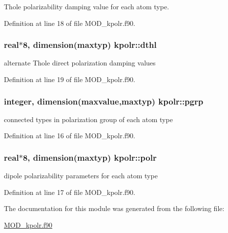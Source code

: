 Thole polarizability damping value for each atom type. 



Definition at line 18 of file M\-O\-D\-\_\-kpolr.\-f90.

\hypertarget{classkpolr_a4677ab2a3c6caf2953976d7715cc8d62}{
\subsubsection[{dthl}]{\setlength{\rightskip}{0pt plus 5cm}real$\ast$8, dimension(maxtyp) kpolr\-::dthl}}\label{classkpolr_a4677ab2a3c6caf2953976d7715cc8d62}


alternate Thole direct polarization damping values 



Definition at line 19 of file M\-O\-D\-\_\-kpolr.\-f90.

\hypertarget{classkpolr_a0e53a03241862e10a4c2075bf131a8a6}{
\subsubsection[{pgrp}]{\setlength{\rightskip}{0pt plus 5cm}integer, dimension(maxvalue,maxtyp) kpolr\-::pgrp}}\label{classkpolr_a0e53a03241862e10a4c2075bf131a8a6}


connected types in polarization group of each atom type 



Definition at line 16 of file M\-O\-D\-\_\-kpolr.\-f90.

\hypertarget{classkpolr_a2815e5ccaabe2b56f7e6de72e0c52ed3}{
\subsubsection[{polr}]{\setlength{\rightskip}{0pt plus 5cm}real$\ast$8, dimension(maxtyp) kpolr\-::polr}}\label{classkpolr_a2815e5ccaabe2b56f7e6de72e0c52ed3}


dipole polarizability parameters for each atom type 



Definition at line 17 of file M\-O\-D\-\_\-kpolr.\-f90.



The documentation for this module was generated from the following file\-:\begin{DoxyCompactItemize}
\item 
\hyperlink{MOD__kpolr_8f90}{M\-O\-D\-\_\-kpolr.\-f90}\end{DoxyCompactItemize}
